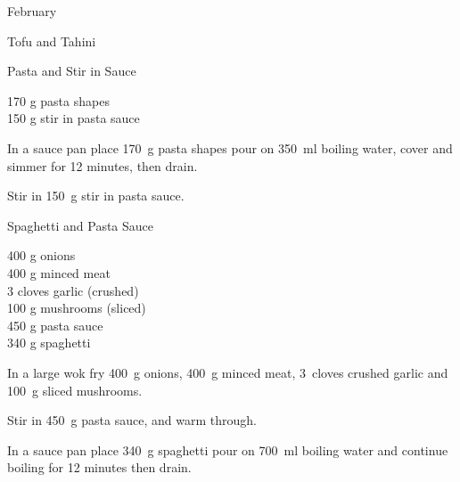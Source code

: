 \begin{menu}{February}
\begin{recipe}{2}{Tofu and Tahini}
\begin{instructions}
    \end{instructions}
    \end{recipe}%
  
    \begin{recipe}{1}{Pasta and Stir in Sauce}%
		\begin{ingredients}
		170 g pasta shapes  \\
	150 g stir in pasta sauce  \\
	
		\end{ingredients}
	
	
    \begin{instructions}
    \item 
    In a
    sauce pan
    place
    170~g  pasta shapes
    pour on
    350~ml  boiling water,
    cover and simmer for 12 minutes, then drain.
  \item 
        Stir in
        150~g  stir in pasta sauce.
      
    \end{instructions}
    \end{recipe}%
  
    \begin{recipe}{2}{Spaghetti and Pasta Sauce}%
		\begin{ingredients}
		400 g onions  \\
	400 g minced meat  \\
	3 cloves garlic (crushed) \\
	100 g mushrooms (sliced) \\
	450 g pasta sauce  \\
	340 g spaghetti  \\
	
		\end{ingredients}
	
	
	
    \begin{instructions}
    \item 
        In a large wok fry
        400~g  onions,
        400~g  minced meat,
        3~cloves crushed garlic
        and
        100~g sliced mushrooms.
      \item 
        Stir in
        450~g  pasta sauce,
        and warm through.
      \item 
    In a
    sauce pan
    place
    340~g  spaghetti
    pour on
    700~ml  boiling water and continue boiling for 12 minutes then drain.
  

\end{instructions}
\end{recipe}
\end{menu}
